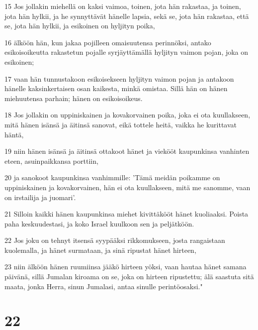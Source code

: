 \par 15 Jos jollakin miehellä on kaksi vaimoa, toinen, jota hän rakastaa, ja toinen, jota hän hylkii, ja he synnyttävät hänelle lapsia, sekä se, jota hän rakastaa, että se, jota hän hylkii, ja esikoinen on hyljityn poika,
\par 16 älköön hän, kun jakaa pojilleen omaisuutensa perinnöksi, antako esikoisoikeutta rakastetun pojalle syrjäyttämällä hyljityn vaimon pojan, joka on esikoinen;
\par 17 vaan hän tunnustakoon esikoisekseen hyljityn vaimon pojan ja antakoon hänelle kaksinkertaisen osan kaikesta, minkä omistaa. Sillä hän on hänen miehuutensa parhain; hänen on esikoisoikeus.
\par 18 Jos jollakin on uppiniskainen ja kovakorvainen poika, joka ei ota kuullakseen, mitä hänen isänsä ja äitinsä sanovat, eikä tottele heitä, vaikka he kurittavat häntä,
\par 19 niin hänen isänsä ja äitinsä ottakoot hänet ja viekööt kaupunkinsa vanhinten eteen, asuinpaikkansa porttiin,
\par 20 ja sanokoot kaupunkinsa vanhimmille: 'Tämä meidän poikamme on uppiniskainen ja kovakorvainen, hän ei ota kuullakseen, mitä me sanomme, vaan on irstailija ja juomari'.
\par 21 Silloin kaikki hänen kaupunkinsa miehet kivittäkööt hänet kuoliaaksi. Poista paha keskuudestasi, ja koko Israel kuulkoon sen ja peljätköön.
\par 22 Jos joku on tehnyt itsensä syypääksi rikkomukseen, josta rangaistaan kuolemalla, ja hänet surmataan, ja sinä ripustat hänet hirteen,
\par 23 niin älköön hänen ruumiinsa jääkö hirteen yöksi, vaan hautaa hänet samana päivänä, sillä Jumalan kiroama on se, joka on hirteen ripustettu; älä saastuta sitä maata, jonka Herra, sinun Jumalasi, antaa sinulle perintöosaksi."

\chapter{22}

